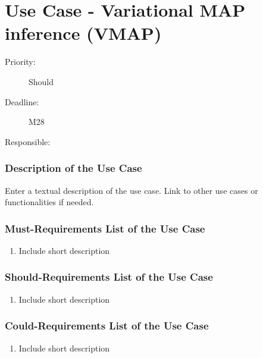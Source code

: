 \newpage
\section{Use Case - Variational MAP inference (VMAP)}
\label{UseCase:VMAP}

\begin{description}
\item[Priority:] Should
\item[Deadline:] M28
\item[Responsible:]
\end{description}

\subsubsection*{Description of the Use Case}

Enter a textual description of the use case. Link to other use cases or functionalities if needed. 


\subsubsection*{Must-Requirements List of the Use Case}

\begin{enumerate}
\item Include short description
\end{enumerate}

\subsubsection*{Should-Requirements List of the Use Case}

\begin{enumerate}
\item Include short description
\end{enumerate}

\subsubsection*{Could-Requirements List of the Use Case}

\begin{enumerate}
\item Include short description
\end{enumerate}


